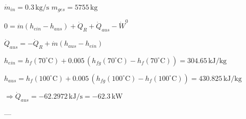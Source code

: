 \( \dot{m}_{in} = 0.3 \, \text{kg/s} \)  
\( m_{ges} = 5755 \, \text{kg} \)  

\( 0 = \dot{m} (h_{ein} - h_{aus}) + \dot{Q}_R + \dot{Q}_{aus} - \dot{W}^0 \)  

\( \dot{Q}_{aus} = -\dot{Q}_R + \dot{m} (h_{aus} - h_{ein}) \)  

\( h_{ein} = h_f(70^\circ \text{C}) + 0.005 \, (h_{fg}(70^\circ \text{C}) - h_f(70^\circ \text{C})) = 304.65 \, \text{kJ/kg} \)  

\( h_{aus} = h_f(100^\circ \text{C}) + 0.005 \, (h_{fg}(100^\circ \text{C}) - h_f(100^\circ \text{C})) = 430.825 \, \text{kJ/kg} \)  

\( \Rightarrow \dot{Q}_{aus} = -62.2972 \, \text{kJ/s} = -62.3 \, \text{kW} \)  

---